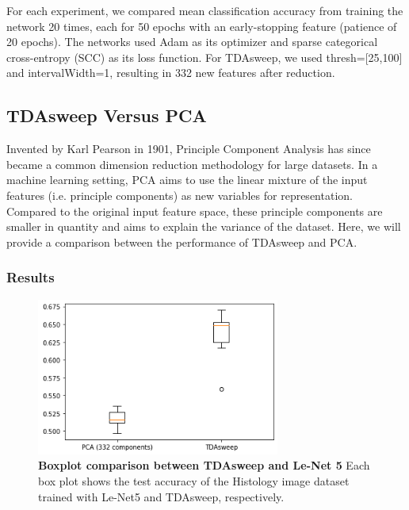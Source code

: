 \documentclass{article}
\begin{document}
For each experiment, we compared mean classification accuracy from training the network 20 times, each for 50 epochs with an early-stopping feature (patience of 20 epochs). The networks used Adam as its optimizer and sparse categorical cross-entropy (SCC) as its loss function. For TDAsweep, we used thresh=[25,100] and intervalWidth=1, resulting in 332 new features after reduction.

\subsection{TDAsweep Versus PCA}
Invented by Karl Pearson in 1901, Principle Component Analysis has since became a common dimension reduction methodology for large datasets. In a machine learning setting, PCA aims to use the linear mixture of the input features (i.e. principle components) as new variables for representation. Compared to the original input feature space, these principle components are smaller in quantity and aims to explain the variance of the dataset. Here, we will provide a comparison between the performance of TDAsweep and PCA.

\subsubsection{Results}


\begin{figure}[!ht]
\centering
\includegraphics[width=8cm]{pca_vs_tdasweep.png}
\caption{{\bf Boxplot comparison between TDAsweep and Le-Net 5} Each box plot shows the test accuracy of the Histology image dataset trained with Le-Net5 and TDAsweep, respectively.}
\label{pca_tdasweep}
\end{figure}
\end{document}

